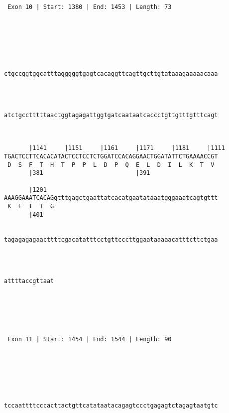 \documentclass{article}
\begin{document}
\begin{Verbatim}
       
  



 Exon 10 | Start: 1380 | End: 1453 | Length: 73 





   
                                                            
ctgccggtggcatttagggggtgagtcacaggttcagttgcttgtataaagaaaaacaaa
                                                            
                                                            
   
                                                            
atctgcctttttaactggtagagattggtgatcaataatcaccctgttgtttgtttcagt
                                                            
                                                            
   
       |1141     |1151     |1161     |1171     |1181     |1111
TGACTCCTTCACACATACTCCTCCTCTGGATCCACAGGAACTGGATATTCTGAAAACCGT
 D  S  F  T  H  T  P  P  L  D  P  Q  E  L  D  I  L  K  T  V 
       |381                          |391                   
   
       |1201                                                
AAAGGAAATCACAGgtttgagctgaattatcacatgaatataaatgggaaatcagtgttt
 K  E  I  T  G                                              
       |401                                                 
   
                                                            
tagagagagaacttttcgacatatttcctgttcccttggaataaaaacatttcttctgaa
                                                            
                                                            
   
              
attttaccgttaat
              
              
  



 Exon 11 | Start: 1454 | End: 1544 | Length: 90 





   
                                                            
tccaattttcccacttactgttcatataatacagagtccctgagagtctagagtaatgtc
                                                            
                                                            
   

\end{Verbatim}
\end{document}
